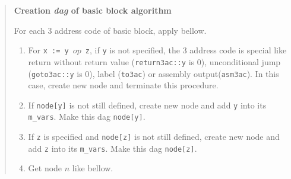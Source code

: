 \begin{quote}
{\bf Creation {\em dag} of basic block algorithm}

For each 3 address code of basic block, apply bellow. 
\begin{enumerate}
\item For {\tt{x := y $op$ z}}, if {\tt{y}} is not specified,
      the 3 address code is special like 
      return without return value
      ({\tt{return3ac::y}} is 0),
      unconditional jump ({\tt{goto3ac::y}} is 0),
      label ({\tt{to3ac}}) or
      assembly output({\tt{asm3ac}}).
      In this case, create new node and terminate this procedure. 

\item If {\tt{node[y]}} is not still defined, 
      create new node and add {\tt{y}} into its {\tt{m\_vars}}.
      Make this dag {\tt{node[y]}}. 

\item If {\tt{z}} is specified and {\tt{node[z]}} is not still defined,
      create new node and add {\tt{z}} into its {\tt{m\_vars}}.
      Make this dag {\tt{node[z]}}.

\item 
\label{optimize_e047}
Get node $n$ like bellow.


\end{enumerate}
\end{quote}
